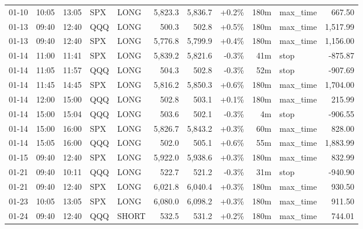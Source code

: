 \documentclass[11pt,a4paper,twoside]{article}
\begin{document}
\begin{center}
\begin{longtable}{>{\color{txtmain}}l l l l l r r r r >{\color{txtmain}}l r}
01-10 & 10:05 & 13:05 & SPX & LONG & 5,823.3 & 5,836.7 & \textcolor{wingreen}{+0.2\%} & 180m & max\_time & \textcolor{wingreen}{667.50} \\
01-13 & 09:40 & 12:40 & QQQ & LONG & 500.3 & 502.8 & \textcolor{wingreen}{+0.5\%} & 180m & max\_time & \textcolor{wingreen}{1,517.99} \\
01-13 & 09:40 & 12:40 & SPX & LONG & 5,776.8 & 5,799.9 & \textcolor{wingreen}{+0.4\%} & 180m & max\_time & \textcolor{wingreen}{1,156.00} \\
01-14 & 11:00 & 11:41 & SPX & LONG & 5,839.2 & 5,821.6 & \textcolor{lossred}{-0.3\%} & 41m & stop & \textcolor{lossred}{-875.87} \\
01-14 & 11:05 & 11:57 & QQQ & LONG & 504.3 & 502.8 & \textcolor{lossred}{-0.3\%} & 52m & stop & \textcolor{lossred}{-907.69} \\
01-14 & 11:45 & 14:45 & SPX & LONG & 5,816.2 & 5,850.3 & \textcolor{wingreen}{+0.6\%} & 180m & max\_time & \textcolor{wingreen}{1,704.00} \\
01-14 & 12:00 & 15:00 & QQQ & LONG & 502.8 & 503.1 & \textcolor{wingreen}{+0.1\%} & 180m & max\_time & \textcolor{wingreen}{215.99} \\
01-14 & 15:00 & 15:04 & QQQ & LONG & 503.6 & 502.1 & \textcolor{lossred}{-0.3\%} & 4m & stop & \textcolor{lossred}{-906.55} \\
01-14 & 15:00 & 16:00 & SPX & LONG & 5,826.7 & 5,843.2 & \textcolor{wingreen}{+0.3\%} & 60m & max\_time & \textcolor{wingreen}{828.00} \\
01-14 & 15:05 & 16:00 & QQQ & LONG & 502.0 & 505.1 & \textcolor{wingreen}{+0.6\%} & 55m & max\_time & \textcolor{wingreen}{1,883.99} \\
01-15 & 09:40 & 12:40 & SPX & LONG & 5,922.0 & 5,938.6 & \textcolor{wingreen}{+0.3\%} & 180m & max\_time & \textcolor{wingreen}{832.99} \\
01-21 & 09:40 & 10:11 & QQQ & LONG & 522.7 & 521.2 & \textcolor{lossred}{-0.3\%} & 31m & stop & \textcolor{lossred}{-940.90} \\
01-21 & 09:40 & 12:40 & SPX & LONG & 6,021.8 & 6,040.4 & \textcolor{wingreen}{+0.3\%} & 180m & max\_time & \textcolor{wingreen}{930.50} \\
01-23 & 10:05 & 13:05 & SPX & LONG & 6,080.0 & 6,098.2 & \textcolor{wingreen}{+0.3\%} & 180m & max\_time & \textcolor{wingreen}{911.50} \\
01-24 & 09:40 & 12:40 & QQQ & SHORT & 532.5 & 531.2 & \textcolor{wingreen}{+0.2\%} & 180m & max\_time & \textcolor{wingreen}{744.01} \\

\end{longtable}
\end{center}
\end{document}
